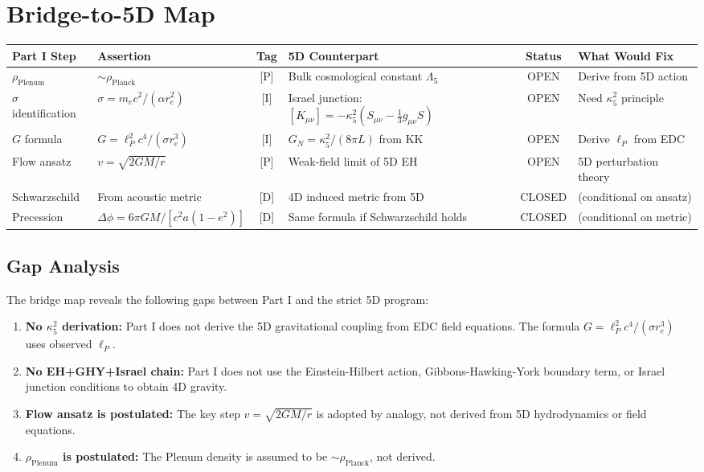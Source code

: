 \documentclass[11pt,a4paper]{article}
\begin{document}
\section{Bridge-to-5D Map}
\label{sec:bridge}

\begin{center}
\small
\begin{tabular}{|p{2.5cm}|p{3cm}|c|p{3cm}|c|p{2.5cm}|}
\hline
\textbf{Part I Step} & \textbf{Assertion} & \textbf{Tag} & \textbf{5D Counterpart} & \textbf{Status} & \textbf{What Would Fix} \\
\hline
\hline
$\rho_{\text{Plenum}}$ & $\sim \rho_{\text{Planck}}$ & [P] & Bulk cosmological constant $\Lambda_5$ & OPEN & Derive from 5D action \\
\hline
$\sigma$ identification & $\sigma = m_e c^2/(\alpha r_e^2)$ & [I] & Israel junction: $[K_{\mu\nu}] = -\kappa_5^2 (S_{\mu\nu} - \frac{1}{3}g_{\mu\nu}S)$ & OPEN & Need $\kappa_5^2$ principle \\
\hline
$G$ formula & $G = \ell_P^2 c^4/(\sigma r_e^3)$ & [I] & $G_N = \kappa_5^2/(8\pi L)$ from KK & OPEN & Derive $\ell_P$ from EDC \\
\hline
Flow ansatz & $v = \sqrt{2GM/r}$ & [P] & Weak-field limit of 5D EH & OPEN & 5D perturbation theory \\
\hline
Schwarzschild & From acoustic metric & [D] & 4D induced metric from 5D & CLOSED & (conditional on ansatz) \\
\hline
Precession & $\Delta\phi = 6\pi GM/[c^2 a(1-e^2)]$ & [D] & Same formula if Schwarzschild holds & CLOSED & (conditional on metric) \\
\hline
\end{tabular}
\end{center}

\subsection{Gap Analysis}

The bridge map reveals the following gaps between Part I and the strict 5D program:

\begin{enumerate}
    \item \textbf{No $\kappa_5^2$ derivation:} Part I does not derive the 5D gravitational coupling from EDC field equations. The formula $G = \ell_P^2 c^4/(\sigma r_e^3)$ uses observed $\ell_P$.

    \item \textbf{No EH+GHY+Israel chain:} Part I does not use the Einstein-Hilbert action, Gibbons-Hawking-York boundary term, or Israel junction conditions to obtain 4D gravity.

    \item \textbf{Flow ansatz is postulated:} The key step $v = \sqrt{2GM/r}$ is adopted by analogy, not derived from 5D hydrodynamics or field equations.

    \item \textbf{$\rho_{\text{Plenum}}$ is postulated:} The Plenum density is assumed to be $\sim \rho_{\text{Planck}}$, not derived.
\end{enumerate}
\end{document}
